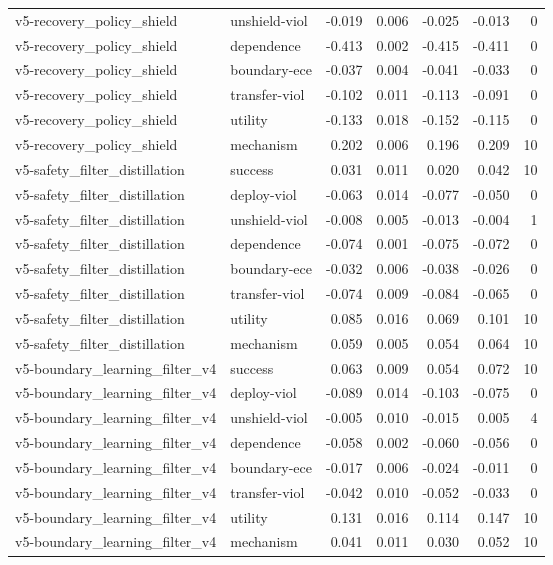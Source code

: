 \documentclass{article}
\begin{document}
\begin{longtable}{@{}llrrrrr@{}}
v5-recovery\_policy\_shield & unshield-viol & -0.019 & 0.006 & -0.025 & -0.013 & 0 \\
v5-recovery\_policy\_shield & dependence & -0.413 & 0.002 & -0.415 & -0.411 & 0 \\
v5-recovery\_policy\_shield & boundary-ece & -0.037 & 0.004 & -0.041 & -0.033 & 0 \\
v5-recovery\_policy\_shield & transfer-viol & -0.102 & 0.011 & -0.113 & -0.091 & 0 \\
v5-recovery\_policy\_shield & utility & -0.133 & 0.018 & -0.152 & -0.115 & 0 \\
v5-recovery\_policy\_shield & mechanism & 0.202 & 0.006 & 0.196 & 0.209 & 10 \\
v5-safety\_filter\_distillation & success & 0.031 & 0.011 & 0.020 & 0.042 & 10 \\
v5-safety\_filter\_distillation & deploy-viol & -0.063 & 0.014 & -0.077 & -0.050 & 0 \\
v5-safety\_filter\_distillation & unshield-viol & -0.008 & 0.005 & -0.013 & -0.004 & 1 \\
v5-safety\_filter\_distillation & dependence & -0.074 & 0.001 & -0.075 & -0.072 & 0 \\
v5-safety\_filter\_distillation & boundary-ece & -0.032 & 0.006 & -0.038 & -0.026 & 0 \\
v5-safety\_filter\_distillation & transfer-viol & -0.074 & 0.009 & -0.084 & -0.065 & 0 \\
v5-safety\_filter\_distillation & utility & 0.085 & 0.016 & 0.069 & 0.101 & 10 \\
v5-safety\_filter\_distillation & mechanism & 0.059 & 0.005 & 0.054 & 0.064 & 10 \\
v5-boundary\_learning\_filter\_v4 & success & 0.063 & 0.009 & 0.054 & 0.072 & 10 \\
v5-boundary\_learning\_filter\_v4 & deploy-viol & -0.089 & 0.014 & -0.103 & -0.075 & 0 \\
v5-boundary\_learning\_filter\_v4 & unshield-viol & -0.005 & 0.010 & -0.015 & 0.005 & 4 \\
v5-boundary\_learning\_filter\_v4 & dependence & -0.058 & 0.002 & -0.060 & -0.056 & 0 \\
v5-boundary\_learning\_filter\_v4 & boundary-ece & -0.017 & 0.006 & -0.024 & -0.011 & 0 \\
v5-boundary\_learning\_filter\_v4 & transfer-viol & -0.042 & 0.010 & -0.052 & -0.033 & 0 \\
v5-boundary\_learning\_filter\_v4 & utility & 0.131 & 0.016 & 0.114 & 0.147 & 10 \\
v5-boundary\_learning\_filter\_v4 & mechanism & 0.041 & 0.011 & 0.030 & 0.052 & 10 \\
\bottomrule
\end{longtable}
\endgroup
\end{document}
